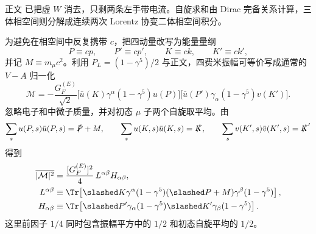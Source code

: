 \begin{derivation}
正文 已把虚 $W$ 消去，只剩两条左手带电流。自旋求和由 Dirac 完备关系计算，三体相空间则分解成连续两次 Lorentz 协变二体相空间积分。

为避免在相空间中反复携带 $c$，把四动量改写为能量量纲
\begin{equation*}
P\equiv cp,\qquad P'\equiv cp',\qquad K\equiv ck,\qquad K'\equiv ck',
\end{equation*}
并记 $M\equiv m_\mu c^2$。利用 $P_L=(1-\gamma^5)/2$ 与正文，四费米振幅可等价写成通常的 $V-A$ 归一化
\begin{equation*}
\mathcal M
=-\frac{G_F^{(E)}}{\sqrt2}
\bigl[\bar u(K)\gamma^\alpha(1-\gamma^5)u(P)\bigr]
\bigl[\bar u(P')\gamma_\alpha(1-\gamma^5)v(K')\bigr].
\end{equation*}
忽略电子和中微子质量，并对初态 $\mu$ 子两个自旋取平均。由
\[
\sum_su(P,s)\bar u(P,s)=\slashed P+M,
\qquad
\sum_su(K,s)\bar u(K,s)=\slashed K,
\qquad
\sum_sv(K',s)\bar v(K',s)=\slashed K'
\]
得到
\begin{align*}
\overline{|\mathcal M|^2}
&=\frac{[G_F^{(E)}]^2}{4}\,
L^{\alpha\beta}H_{\alpha\beta},\\
L^{\alpha\beta}
&\equiv
\Tr\!\left[
\slashed K\gamma^\alpha(1-\gamma^5)
(\slashed P+M)\gamma^\beta(1-\gamma^5)
\right],\\
H_{\alpha\beta}
&\equiv
\Tr\!\left[
\slashed P'\gamma_\alpha(1-\gamma^5)
\slashed K'\gamma_\beta(1-\gamma^5)
\right].
\end{align*}
这里前因子 $1/4$ 同时包含振幅平方中的 $1/2$ 和初态自旋平均的 $1/2$。


\end{derivation}
